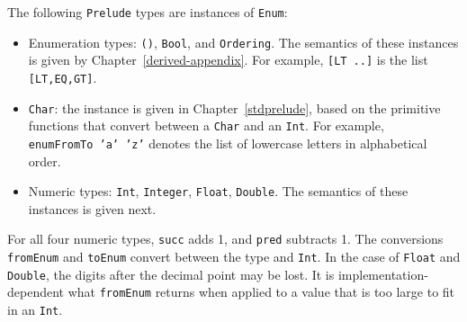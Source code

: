 The following \mbox{\tt Prelude} types are instances of \mbox{\tt Enum}: 
\begin{itemize}
\item Enumeration types: \mbox{\tt ()}, \mbox{\tt Bool}, and \mbox{\tt Ordering}. The
semantics of these instances is given by Chapter~\ref{derived-appendix}.
For example, \mbox{\tt [LT\ ..]} is the list \mbox{\tt [LT,EQ,GT]}.

\item \mbox{\tt Char}: the instance is given in Chapter~\ref{stdprelude}, based
on the primitive functions that convert between a \mbox{\tt Char} and an \mbox{\tt Int}.
For example, \mbox{\tt enumFromTo\ 'a'\ 'z'} denotes
the list of lowercase letters in alphabetical order.

\item Numeric types: \mbox{\tt Int}, \mbox{\tt Integer}, \mbox{\tt Float}, \mbox{\tt Double}.  The semantics
of these instances is given next.
\end{itemize}
For all four numeric types, \mbox{\tt succ} adds 1, and \mbox{\tt pred} subtracts 1.
The conversions \mbox{\tt fromEnum} and \mbox{\tt toEnum} convert between the type and \mbox{\tt Int}.
In the case of \mbox{\tt Float} and \mbox{\tt Double}, the digits after the decimal point may be lost.
It is implementation-dependent what \mbox{\tt fromEnum} returns when applied to 
a value that is too large to fit in an \mbox{\tt Int}.

